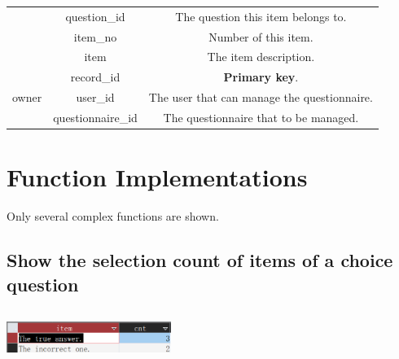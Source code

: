 \documentclass[scheme=plain,12pt]{ctexart}
\begin{document}
\begin{center}
\begin{tabular}{|c|c|c|}
             & question\_id & The question this item belongs to. \\ \cline{2-3}
             & item\_no & Number of this item. \\ \cline{2-3}
             & item & The item description. \\ \hline
            \multirow{3}{*}{owner} & record\_id & \textbf{Primary key}. \\ \cline{2-3}
             & user\_id & The user that can manage the questionnaire. \\ \cline{2-3}
             & questionnaire\_id & The questionnaire that to be managed. \\ \hline
        \end{tabular}
    \end{center}

    \section{Function Implementations}

    Only several complex functions are shown.

    \subsection{Show the selection count of items of a choice question}

    \begin{center}
        \small
        \inputminted[bgcolor=codebg,autogobble,linenos=true,breaklines]{sql}{src/fun1.sql}

        \includegraphics[width=0.4\textwidth]{pics/fun1.png}
    \end{center}
\end{document}
